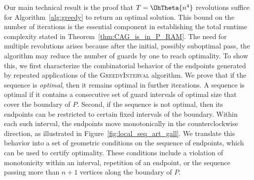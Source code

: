 Our main technical result is the proof that $T = \OhTheta{n^4}$ revolutions suffice for Algorithm~\ref{alg:greedy} to return an optimal solution. 
This bound on the number of iterations is the essential component in establishing the total runtime complexity stated in Theorem~\ref{thm:CAG_is_in_P_RAM}. 
The need for multiple revolutions arises because after the initial, possibly suboptimal pass, the algorithm may reduce the number of guards by one to reach optimality. 
To show this, we first characterize the combinatorial behavior of the endpoints generated by repeated applications of the \textsc{GreedyInterval} algorithm. 
We prove that if the sequence is \emph{optimal}, then it remains optimal in further iterations. 
A sequence is optimal if it contains a consecutive set of guard intervals of optimal size that cover the boundary of $P$. 
Second, if the sequence is not optimal, then its endpoints can be restricted to certain fixed intervals of the boundary. 
Within each such interval, the endpoints move monotonically in the counterclockwise direction, as illustrated in Figure~\ref{fig:local_seq_art_gall}. 
We translate this behavior into a set of geometric conditions on the sequence of endpoints, which can be used to certify optimality. 
These conditions include a violation of monotonicity within an interval, repetition of an endpoint, or the sequence passing more than $n + 1$ vertices along the boundary of $P$. 

